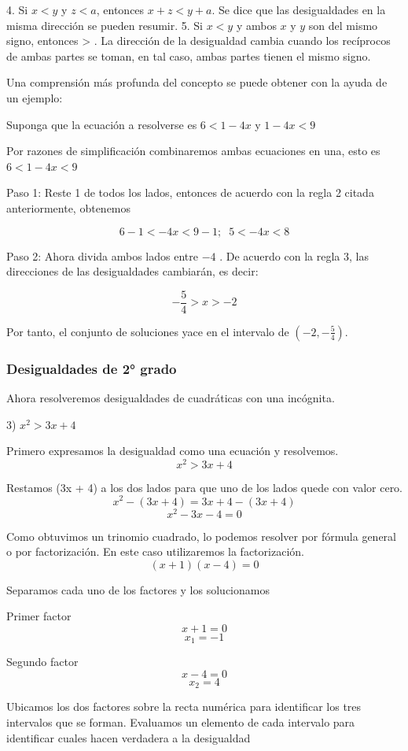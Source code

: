 \documentclass[oneside,spanish,letterpaper]{extbook}
\theoremstyle{mythmstyle}
\begin{document}
4. Si $x < y$ y $z < a$, entonces $x + z < y + a$. Se dice que las desigualdades en la misma dirección
se pueden resumir. 5. Si $x < y$ y ambos $x$ y $y$ son del mismo signo, entonces > . La dirección de la desigualdad
cambia cuando los recíprocos de ambas partes se toman, en tal caso, ambas partes tienen el mismo signo.

Una comprensión más profunda del concepto se puede obtener con la ayuda de un ejemplo:

Suponga que la ecuación a resolverse es $6< 1 - 4x$ y $1 - 4x < 9$

Por razones de simplificación combinaremos ambas ecuaciones en una, esto es $6 <1- 4x < 9$

Paso 1: Reste 1 de todos los lados, entonces de acuerdo con la regla 2 citada anteriormente, obtenemos

$$6 - 1< -4x < 9 -1;\;\; 5< -4x < 8$$

Paso 2: Ahora divida ambos lados entre $-4$ . De acuerdo con la regla 3, las direcciones
de las desigualdades cambiarán, es decir:

$$-\frac{5}{4}> x > -2$$

Por tanto, el conjunto de soluciones yace en el intervalo de $( -2,-\frac{5}{4})$.
\cite{cd2}

\subsubsection{Desigualdades de 2° grado}
Ahora resolveremos desigualdades de cuadráticas con una incógnita.

3) $x^2 > 3x + 4$

Primero expresamos la desigualdad como una ecuación y resolvemos.
$$x^2 > 3x + 4$$

Restamos (3x + 4) a los dos lados para que uno de los lados quede con valor cero.
$$x^2 - (3x + 4) = 3x + 4 - (3x + 4)$$
$$x^2 - 3x - 4 = 0$$

Como obtuvimos un trinomio cuadrado, lo podemos resolver por fórmula general o por factorización.
En este caso utilizaremos la factorización.
$$(x + 1)(x - 4) = 0$$

Separamos cada uno de los factores y los solucionamos

Primer factor
$$x + 1 = 0$$
$$x_1 = -1$$

Segundo factor
$$x - 4 = 0$$
$$x_2 = 4$$

Ubicamos los dos factores sobre la recta numérica para identificar los tres intervalos que se forman. 
Evaluamos un elemento de cada intervalo para identificar cuales hacen verdadera a la desigualdad
\end{document}
